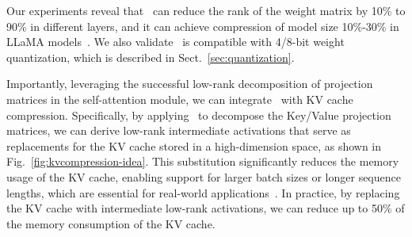 Our experiments reveal that \asvd~can reduce the rank of the weight matrix by 10\% to 90\% in different layers, and it can achieve compression of model size 10\%-30\% in LLaMA models~\citep{touvron2023llama1,touvron2023llama2}.
We also validate \asvd~is compatible with 4/8-bit weight quantization, which is described in Sect.~\ref{sec:quantization}. 

Importantly, leveraging the successful low-rank decomposition of projection matrices in the self-attention module, we can integrate \asvd~with KV cache compression. 
Specifically, by applying \asvd~to decompose the Key/Value projection matrices, we can derive low-rank intermediate activations that serve as replacements for the KV cache stored in a high-dimension space, as shown in Fig.~\ref{fig:kvcompression-idea}. This substitution significantly reduces the memory usage of the KV cache, enabling support for larger batch sizes or longer sequence lengths, which are essential for real-world applications~\citep{yuan2024llmunveiled}.
In practice, by replacing the KV cache with intermediate low-rank activations, we can reduce up to 50\% of the memory consumption of the KV cache.

\vspace{-0.1in}